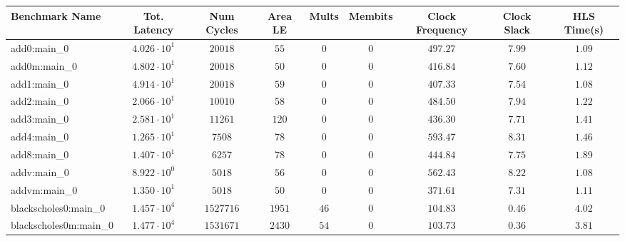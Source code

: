 \begin{tabular}{|l|c|c|c|c|c|c|c|c|}
\hline
Benchmark Name                 & Tot. Latency           & Num Cycles   & Area LE    & Mults    & Membits      & Clock Frequency & Clock Slack & HLS Time(s) \\
\hline
add0:main\_0                   & $ 4.026 \cdot 10^{1} $ & $ 20018    $ & $ 55     $ & $ 0    $ & $ 0        $ & $ 497.27      $ & $ 7.99    $ & $ 1.09    $ \\
add0m:main\_0                  & $ 4.802 \cdot 10^{1} $ & $ 20018    $ & $ 50     $ & $ 0    $ & $ 0        $ & $ 416.84      $ & $ 7.60    $ & $ 1.12    $ \\
add1:main\_0                   & $ 4.914 \cdot 10^{1} $ & $ 20018    $ & $ 59     $ & $ 0    $ & $ 0        $ & $ 407.33      $ & $ 7.54    $ & $ 1.08    $ \\
add2:main\_0                   & $ 2.066 \cdot 10^{1} $ & $ 10010    $ & $ 58     $ & $ 0    $ & $ 0        $ & $ 484.50      $ & $ 7.94    $ & $ 1.22    $ \\
add3:main\_0                   & $ 2.581 \cdot 10^{1} $ & $ 11261    $ & $ 120    $ & $ 0    $ & $ 0        $ & $ 436.30      $ & $ 7.71    $ & $ 1.41    $ \\
add4:main\_0                   & $ 1.265 \cdot 10^{1} $ & $ 7508     $ & $ 78     $ & $ 0    $ & $ 0        $ & $ 593.47      $ & $ 8.31    $ & $ 1.46    $ \\
add8:main\_0                   & $ 1.407 \cdot 10^{1} $ & $ 6257     $ & $ 78     $ & $ 0    $ & $ 0        $ & $ 444.84      $ & $ 7.75    $ & $ 1.89    $ \\
addv:main\_0                   & $ 8.922 \cdot 10^{0} $ & $ 5018     $ & $ 56     $ & $ 0    $ & $ 0        $ & $ 562.43      $ & $ 8.22    $ & $ 1.08    $ \\
addvm:main\_0                  & $ 1.350 \cdot 10^{1} $ & $ 5018     $ & $ 50     $ & $ 0    $ & $ 0        $ & $ 371.61      $ & $ 7.31    $ & $ 1.11    $ \\
blackscholes0:main\_0          & $ 1.457 \cdot 10^{4} $ & $ 1527716  $ & $ 1951   $ & $ 46   $ & $ 0        $ & $ 104.83      $ & $ 0.46    $ & $ 4.02    $ \\
blackscholes0m:main\_0         & $ 1.477 \cdot 10^{4} $ & $ 1531671  $ & $ 2430   $ & $ 54   $ & $ 0        $ & $ 103.73      $ & $ 0.36    $ & $ 3.81    $ \\

\end{tabular}
